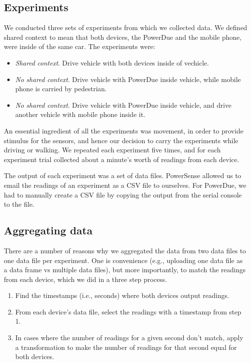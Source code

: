 \documentclass[journal]{IEEEtranTIE}
\begin{document}
\subsection{Experiments}

We conducted three sets of experiments from which we collected data. We defined
shared context to mean that both devices, the PowerDue and the mobile phone,
were inside of the same car. The experiments were:

\begin{itemize}
\item \textit{Shared context}. Drive vehicle with both devices inside of
      vechicle.
\item \textit{No shared context}. Drive vehicle with PowerDue inside vehicle,
      while mobile phone is carried by pedestrian.
\item \textit{No shared context}. Drive vehicle with PowerDue inside vehicle,
      and drive another vehicle with mobile phone inside it.
\end{itemize}

An essential ingredient of all the experiments was movement, in order to provide
stimulus for the sensors, and hence our decision to carry the experiments while
driving or walking. We repeated each experiment five times, and for each
experiment trial collected about a minute's worth of readings from each device.

The output of each experiment was a set of data files. PowerSense allowed us to
email the readings of an experiment as a CSV file to ourselves. For PowerDue, we
had to manually create a CSV file by copying the output from the serial console
to the file.

\subsection{Aggregating data}

There are a number of reasons why we aggregated the data from two data files to
one data file per experiment. One is convenience (e.g., uploading one data file
as a data frame vs multiple data files), but more importantly, to match the
readings from each device, which we did in a three step process.

\begin{enumerate}
\item Find the timestamps (i.e., seconds) where both devices output readings.
\item From each device's data file, select the readings with a timestamp from
      step 1.
\item In cases where the number of readings for a given second don't match,
      apply a transformation to make the number of readings for that second
      equal for both devices.
\end{enumerate}
\end{document}

